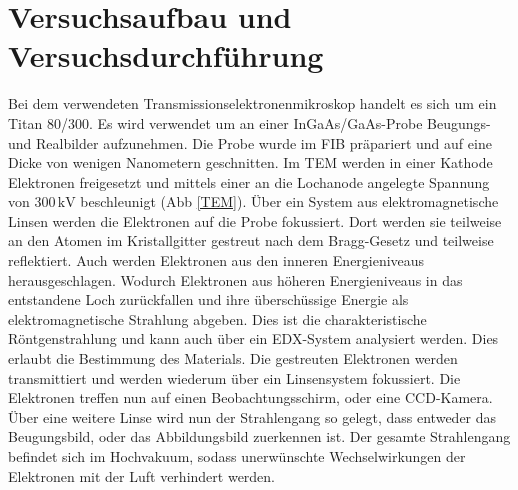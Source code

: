 \documentclass[a4paper,11pt,DIV=11]{scrartcl}
\begin{document}
\section{Versuchsaufbau und Versuchsdurchführung}
Bei dem verwendeten Transmissionselektronenmikroskop handelt es sich um ein Titan 80/300. Es wird verwendet um an einer InGaAs/GaAs-Probe Beugungs- und Realbilder aufzunehmen. Die Probe wurde im FIB präpariert und auf eine Dicke von wenigen Nanometern geschnitten. Im TEM werden in einer Kathode Elektronen freigesetzt und mittels einer an die Lochanode angelegte Spannung von \(300\,\mathrm{kV}\) beschleunigt (Abb \ref{TEM}). Über ein System aus elektromagnetische Linsen werden die Elektronen auf die Probe fokussiert. Dort werden sie teilweise an den Atomen im Kristallgitter gestreut nach dem Bragg-Gesetz und teilweise reflektiert. Auch werden Elektronen aus den inneren Energieniveaus herausgeschlagen. Wodurch Elektronen aus höheren Energieniveaus in das entstandene Loch zurückfallen und ihre überschüssige Energie als elektromagnetische Strahlung abgeben. Dies ist die charakteristische Röntgenstrahlung und kann auch über ein EDX-System analysiert werden. Dies erlaubt die Bestimmung des Materials.
Die gestreuten Elektronen werden transmittiert und werden wiederum über ein Linsensystem fokussiert. Die Elektronen treffen nun auf einen Beobachtungsschirm, oder eine CCD-Kamera. Über eine weitere Linse wird nun der Strahlengang so gelegt, dass entweder das Beugungsbild, oder das Abbildungsbild zuerkennen ist. Der gesamte Strahlengang befindet sich im Hochvakuum, sodass unerwünschte Wechselwirkungen der Elektronen mit der Luft verhindert werden.
\end{document}
